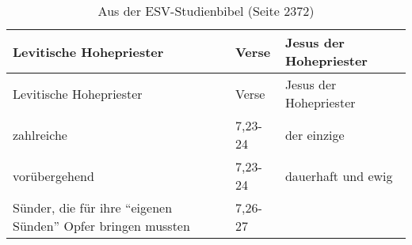 \documentclass[
  12pt,
]{krantz}
\begin{document}
\begin{longtable}[]{@{}lll@{}}
\caption{Aus der ESV-Studienbibel (Seite 2372)}\tabularnewline
\toprule
\begin{minipage}[b]{0.35\columnwidth}\raggedright
Levitische Hohepriester\strut
\end{minipage} & \begin{minipage}[b]{0.19\columnwidth}\raggedright
Verse\strut
\end{minipage} & \begin{minipage}[b]{0.35\columnwidth}\raggedright
Jesus der Hohepriester\strut
\end{minipage}\tabularnewline
\midrule
\endfirsthead
\toprule
\begin{minipage}[b]{0.35\columnwidth}\raggedright
Levitische Hohepriester\strut
\end{minipage} & \begin{minipage}[b]{0.19\columnwidth}\raggedright
Verse\strut
\end{minipage} & \begin{minipage}[b]{0.35\columnwidth}\raggedright
Jesus der Hohepriester\strut
\end{minipage}\tabularnewline
\midrule
\endhead
\begin{minipage}[t]{0.35\columnwidth}\raggedright
zahlreiche\strut
\end{minipage} & \begin{minipage}[t]{0.19\columnwidth}\raggedright
7,23-24\strut
\end{minipage} & \begin{minipage}[t]{0.35\columnwidth}\raggedright
der einzige\strut
\end{minipage}\tabularnewline
\begin{minipage}[t]{0.35\columnwidth}\raggedright
vorübergehend\strut
\end{minipage} & \begin{minipage}[t]{0.19\columnwidth}\raggedright
7,23-24\strut
\end{minipage} & \begin{minipage}[t]{0.35\columnwidth}\raggedright
dauerhaft und ewig\strut
\end{minipage}\tabularnewline
\begin{minipage}[t]{0.35\columnwidth}\raggedright
Sünder, die für ihre
``eigenen Sünden'' Opfer
bringen mussten\strut
\end{minipage} & \begin{minipage}[t]{0.19\columnwidth}\raggedright
7,26-27\strut
\end{minipage} & \begin{minipage}[t]{0.35\columnwidth}\raggedright

\end{minipage}
\end{longtable}
\end{document}
